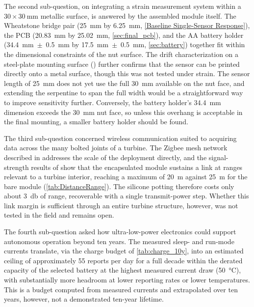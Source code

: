 The second sub-question, on integrating a strain measurement system within a $30\times\SI{30}{\milli\meter}$ metallic surface, is answered by the assembled module itself. The Wheatstone bridge pair (\SI{25}{\milli\meter} by \SI{6.25}{\milli\meter}, \cref{Baseline Single-Sensor Response}), the PCB (\SI{20.83}{\milli\meter} by \SI{25.02}{\milli\meter}, \cref{sec:final_pcb}), and the \textonehalf AA battery holder (\SI{34.4}{\milli\meter}~$\pm$~\SI{0.5}{\milli\meter} by \SI{17.5}{\milli\meter}~$\pm$~\SI{0.5}{\milli\meter}, \cref{sec:battery}) together fit within the dimensional constraints of the nut surface. The drift characterization on a steel-plate mounting surface () further confirms that the sensor can be printed directly onto a metal surface, though this was not tested under strain. The sensor length of \SI{25}{\milli\meter} does not yet use the full \SI{30}{\milli\meter} available on the nut face, and extending the serpentine to span the full width would be a straightforward way to improve sensitivity further. Conversely, the battery holder's \SI{34.4}{\milli\meter} dimension exceeds the \SI{30}{\milli\meter} nut face, so unless this overhang is acceptable in the final mounting, a smaller battery holder should be found.

The third sub-question concerned wireless communication suited to acquiring data across the many bolted joints of a turbine. The Zigbee mesh network described in  addresses the scale of the deployment directly, and the signal-strength results of  show that the encapsulated module sustains a link at ranges relevant to a turbine interior, reaching a maximum of \SI{20}{\meter} against \SI{25}{\meter} for the bare module (\cref{tab:DistanceRange}). The silicone potting therefore costs only about \SI{3}{\decibel} of range, recoverable with a single transmit-power step. Whether this link margin is sufficient through an entire turbine structure, however, was not tested in the field and remains open.

The fourth sub-question asked how ultra-low-power electronics could support autonomous operation beyond ten years. The measured sleep- and run-mode currents translate, via the charge budget of \cref{tab:charge_10y}, into an estimated ceiling of approximately 55 reports per day for a full decade within the derated capacity of the selected battery at the highest measured current draw (\SI{50}{\celsius}), with substantially more headroom at lower reporting rates or lower temperatures. This is a budget computed from measured currents and extrapolated over ten years, however, not a demonstrated ten-year lifetime. 

